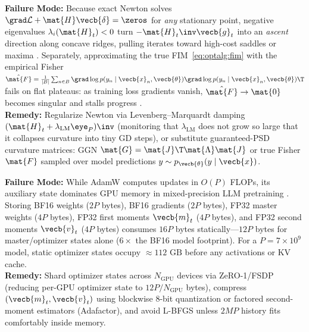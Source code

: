 \documentclass[../../../../master.tex]{subfiles}
\begin{document}
\begin{pitfall}
\label{pit:optalg:saddle_efim}
\textbf{Failure Mode:} Because exact Newton solves $\grad\mathcal{L} + \mat{H}\vecb{\delta} = \zeros$ for \emph{any} stationary point, negative eigenvalues $\lambda_i(\mat{H}_t) < 0$ turn $-\mat{H}_t\inv\vecb{g}_t$ into an \emph{ascent} direction along concave ridges, pulling iterates toward high-cost saddles or maxima  . Separately, approximating the true FIM~\eqref{eq:optalg:fim} with the empirical Fisher $\hat{\mat{F}} = \frac{1}{|B|}\sum_{n\in B}\grad\log p(y_n\mid\vecb{x}_n,\vecb{\theta})\grad\log p(y_n\mid\vecb{x}_n,\vecb{\theta})\T$ fails on flat plateaus: as training loss gradients vanish, $\hat{\mat{F}} \to \mat{0}$ becomes singular and stalls progress .\\
\textbf{Remedy:} Regularize Newton via Levenberg--Marquardt damping $(\mat{H}_t + \lambda_{\mathrm{LM}}\eye_P)\inv$ (monitoring that $\lambda_{\mathrm{LM}}$ does not grow so large that it collapses curvature into tiny GD steps), or substitute guaranteed-PSD curvature matrices: GGN $\mat{G} = \mat{J}\T\mat{\Lambda}\mat{J}$ or true Fisher $\mat{F}$ sampled over model predictions $y \sim p_{\vecb{\theta}}(y\mid\vecb{x})$.
\end{pitfall}

\begin{pitfall}
\label{pit:optalg:memory_llm}
\textbf{Failure Mode:} While AdamW computes updates in $O(P)$ FLOPs, its auxiliary state dominates GPU memory in mixed-precision LLM pretraining . Storing BF16 weights ($2P$ bytes), BF16 gradients ($2P$ bytes), FP32 master weights ($4P$ bytes), FP32 first moments $\vecb{m}_t$ ($4P$ bytes), and FP32 second moments $\vecb{v}_t$ ($4P$ bytes) consumes $16P$ bytes statically---$12P$ bytes for master/optimizer states alone ($6\times$ the BF16 model footprint). For a $P = 7\times 10^9$ model, static optimizer states occupy $\approx 112\text{ GB}$ before any activations or KV cache.\\
\textbf{Remedy:} Shard optimizer states across $N_{\mathrm{GPU}}$ devices via ZeRO-1/FSDP (reducing per-GPU optimizer state to $12P / N_{\mathrm{GPU}}$ bytes), compress $(\vecb{m}_t,\vecb{v}_t)$ using blockwise 8-bit quantization or factored second-moment estimators (Adafactor), and avoid L-BFGS unless $2MP$ history fits comfortably inside memory.
\end{pitfall}

\endgroup
\end{document}
